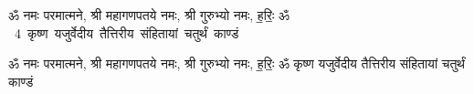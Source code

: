\documentclass[17pt]{extarticle}
\begin{document}
\begin{titlepage}
    \begin{center}
 
\begin{sanskrit}
    { \Large
    ॐ नमः परमात्मने, श्री महागणपतये नमः, 
श्री गुरुभ्यो नमः, ह॒रिः॒ ॐ 
    }
    \\
    \vspace{2.5cm}
    \mbox{ \Huge
    4       कृष्ण यजुर्वेदीय तैत्तिरीय संहितायां चतुर्थं काण्डं   }
\end{sanskrit}
\end{center}

\end{titlepage}
\tableofcontents

ॐ नमः परमात्मने, श्री महागणपतये नमः, 
श्री गुरुभ्यो नमः, ह॒रिः॒ ॐ        कृष्ण यजुर्वेदीय तैत्तिरीय संहितायां चतुर्थं काण्डं \newline
\end{document}
